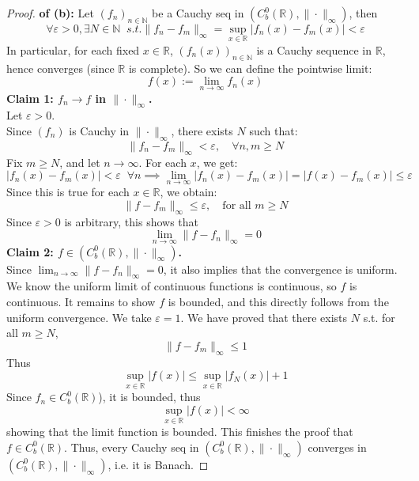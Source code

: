 \documentclass[lang=cn,11pt]{elegantbook}
\begin{document}
\begin{proof}
    \textbf{of (b):} 
Let \((f_n)_{n\in \mathbb{N}}\) be a Cauchy seq in \((C^0_b(\mathbb{R}), \|\cdot\|_\infty)\), then
\[\forall \varepsilon > 0, \exists N \in \mathbb{N}\;\; s.t. \|f_n - f_m\|_\infty  =
\sup_{x \in \mathbb{R}} |f_n(x) - f_m(x)| < \varepsilon
\]In particular, for each fixed \(x \in \mathbb{R}\), \((f_n(x))_{n\in\mathbb{N}}\) is a Cauchy sequence in \(\mathbb{R}\), hence converges (since \(\mathbb{R}\) is complete). So we can define the pointwise limit: \[
f(x) := \lim_{n \to \infty} f_n(x)
\]
\textbf{Claim 1: $f_n\to f$ in $\| \cdot\|_\infty$.}\\
Let $\varepsilon> 0$.\\
Since \((f_n)\) is Cauchy in \(\|\cdot\|_\infty\), there exists \(N\) such that: \[
\|f_n - f_m\|_\infty < \varepsilon, \quad \forall n, m \geq N
\]
Fix \(m \geq N\), and let \(n \to \infty\). For each \(x\), we get: \[
|f_n(x) - f_m(x)| < \varepsilon\;\;  \forall n\implies\lim_{n\to \infty}|f_n(x) - f_m(x)|  =  |f(x) - f_m(x)|\leq \varepsilon
\]
Since this is true for each $x\in \mathbb{R}$, we obtain: \[
\|f - f_m\|_\infty \leq \varepsilon, \quad \text{for all } m \geq N
\]
Since $\varepsilon>0$ is arbitrary, this shows that \[
\lim_{n\to \infty} \| f- f_n\|_{\infty} = 0
\]
\textbf{Claim 2: $f\in (C^0_b(\mathbb{R}), \|\cdot\|_\infty)$.}\\
Since \(\lim_{n\to \infty} \| f- f_n\|_{\infty} = 0\), it also implies that the convergence is uniform.\\
We know the uniform limit of continuous functions is continuous, so $f$ is continuous. It remains to show \(f\) is bounded, and this directly follows from the uniform convergence. We take $\varepsilon = 1$. We have proved that there exists $N$ s.t. for all $m\geq N$, 
\[
\|f - f_m\|_\infty \leq 1
\]
Thus \[
\sup_{x\in \mathbb{R}} |f(x) | \leq \sup_{x\in \mathbb{R}} |f_N(x) |  + 1
\]
Since \(f_n \in C^0_b(\mathbb{R})\)), it is bounded, thus \[
\sup_{x\in \mathbb{R}} |f(x) |  < \infty
\]showing that the limit function is bounded. This finishes the proof that \(f \in C^0_b(\mathbb{R})\).
Thus, every Cauchy seq in \((C^0_b(\mathbb{R}), \|\cdot\|_\infty)\) converges in \((C^0_b(\mathbb{R}), \|\cdot\|_\infty)\), i.e. it is Banach.
\end{proof}
\end{document}
